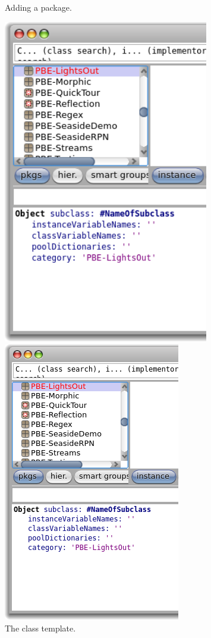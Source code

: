 \documentclass[a4paper,10pt,twoside]{book}
\begin{document}
\begin{figure}[htb]
\begin{minipage}[b]{0.48\textwidth}
	\caption{Adding a package.
	}
\end{minipage}
\hfill
\begin{minipage}[b]{0.48\textwidth}
\ifluluelse
	{\centerline {\includegraphics[width=0.8\textwidth]{ClassTemplate}}}
	{\centerline {\includegraphics[scale=0.6]{ClassTemplate}}}
	\caption{The class template.
	}
\end{minipage}
\end{figure}
\end{document}
